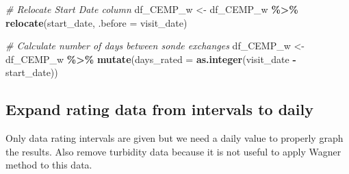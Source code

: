 \documentclass[
]{article}
\newenvironment{Shaded}{\begin{snugshade}}{\end{snugshade}}
\newcommand{\AttributeTok}[1]{\textcolor[rgb]{0.13,0.29,0.53}{#1}}
\newcommand{\CommentTok}[1]{\textcolor[rgb]{0.56,0.35,0.01}{\textit{#1}}}
\newcommand{\FunctionTok}[1]{\textcolor[rgb]{0.13,0.29,0.53}{\textbf{#1}}}
\newcommand{\NormalTok}[1]{#1}
\newcommand{\OtherTok}[1]{\textcolor[rgb]{0.56,0.35,0.01}{#1}}
\newcommand{\SpecialCharTok}[1]{\textcolor[rgb]{0.81,0.36,0.00}{\textbf{#1}}}
\begin{document}
\begin{Shaded}
\begin{Highlighting}[]
\CommentTok{\# Relocate Start Date column}
\NormalTok{df\_CEMP\_w }\OtherTok{\textless{}{-}}\NormalTok{ df\_CEMP\_w }\SpecialCharTok{\%\textgreater{}\%} 
  \FunctionTok{relocate}\NormalTok{(start\_date, }\AttributeTok{.before =}\NormalTok{ visit\_date)}

\CommentTok{\# Calculate number of days between sonde exchanges}
\NormalTok{df\_CEMP\_w }\OtherTok{\textless{}{-}}\NormalTok{ df\_CEMP\_w }\SpecialCharTok{\%\textgreater{}\%}
  \FunctionTok{mutate}\NormalTok{(}\AttributeTok{days\_rated =} \FunctionTok{as.integer}\NormalTok{(visit\_date }\SpecialCharTok{{-}}\NormalTok{ start\_date))}
\end{Highlighting}
\end{Shaded}

\hypertarget{expand-rating-data-from-intervals-to-daily}{%
\subsection{Expand rating data from intervals to
daily}\label{expand-rating-data-from-intervals-to-daily}}

Only data rating intervals are given but we need a daily value to
properly graph the results. Also remove turbidity data because it is not
useful to apply Wagner method to this data.
\end{document}
